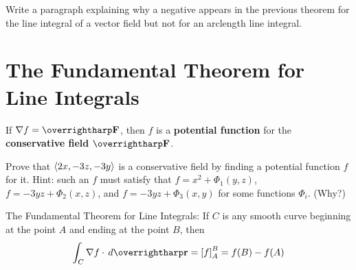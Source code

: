 \documentclass[letterpaper, twoside, 12pt]{book}
\begin{document}
          \begin{problem}
            Write a paragraph explaining why a negative appears in the
            previous theorem for the
            line integral of a vector field but not for an arclength
            line integral.
          \end{problem}

          \begin{solution}

          \end{solution}

          \begin{contributors}

          \end{contributors}


\section{The Fundamental Theorem for Line Integrals} %

\begin{definition}
  If $\nabla f=\vect{F}$, then $f$ is a \textbf{potential function}
  for the \textbf{conservative field} $\vect{F}$.
\end{definition}

          \begin{problem} %
            Prove that $\langle2x,-3z,-3y\rangle$ is a conservative field by
            finding a potential function $f$ for it. Hint: such an $f$
            must satisfy that $f=x^2+\Phi_1(y,z)$, $f=-3yz+\Phi_2(x,z)$,
            and $f=-3yz+\Phi_3(x,y)$ for some functions $\Phi_i$. (Why?)
          \end{problem}

          \begin{solution}

          \end{solution}

          \begin{contributors}

          \end{contributors}

\begin{theorem}
  The Fundamental Theorem for Line Integrals:
  If $C$ is any smooth curve beginning at the point $A$ and ending at the
  point $B$, then
  \[
    \int_C \nabla f\cdot \dvar{\vect{r}} = \left[f\right]_A^B = f(B)-f(A)
  \]
\end{theorem}
\end{document}
